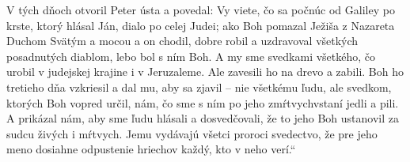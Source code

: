 V tých dňoch otvoril Peter ústa a povedal:
Vy viete, čo sa počnúc od Galiley po krste, ktorý hlásal Ján, dialo po celej Judei; 
ako Boh pomazal Ježiša z Nazareta Duchom Svätým a mocou a on chodil, dobre robil a uzdravoval všetkých posadnutých diablom, lebo bol s ním Boh. 
\versseparator
A my sme svedkami všetkého, čo urobil v judejskej krajine i v Jeruzaleme. Ale zavesili ho na drevo a zabili. Boh ho tretieho dňa vzkriesil a dal mu, aby sa zjavil – nie všetkému ľudu, ale svedkom, ktorých Boh vopred určil, nám, čo sme s ním po jeho zmŕtvychvstaní jedli a pili. 
\versseparator
A prikázal nám, aby sme ľudu hlásali a dosvedčovali, že to jeho Boh ustanovil za sudcu živých i mŕtvych. Jemu vydávajú všetci proroci svedectvo, že pre jeho meno dosiahne odpustenie hriechov každý, kto v neho verí.“